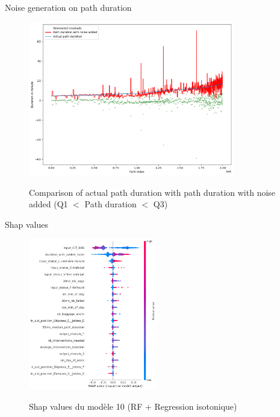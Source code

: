 \documentclass{beamer}
\begin{document}
\begin{frame}{Noise generation on path duration}

\begin{figure}[h]
    \centering
    \includegraphics[width=0.8\textwidth]{Q1_Q3 path duration noised.png}\\
    \caption{Comparison of actual path duration with path duration with noise added (Q1 $<$ Path duration $<$ Q3)}
    \label{fig:Q1_Q3 path duration noised.png}
\end{figure}
    
\end{frame}


\begin{frame}{Shap values}
    \begin{figure}[h]
        \centering
        \includegraphics[width=0.5\textwidth]{shap values.png}\\
        \caption{Shap values du modèle 10 (RF + Regression isotonique)}
        \label{fig:Shap values}
    \end{figure}
\end{frame}
\end{document}
